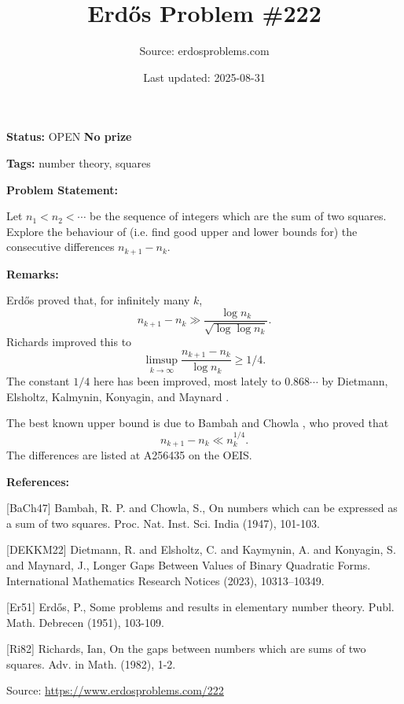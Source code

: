 \documentclass{article}
\title{Erd\H{o}s Problem \#222}
\date{Last updated: 2025-08-31}
\author{Source: erdosproblems.com}
\begin{document}
\maketitle

\noindent\textbf{Status:} OPEN \quad \textbf{No prize}

\noindent\textbf{Tags:} number theory, squares

\medskip
\noindent\textbf{Problem Statement:}

Let $n_1<n_2<\cdots$ be the sequence of integers which are the sum of two squares. Explore the behaviour of (i.e. find good upper and lower bounds for) the consecutive differences $n_{k+1}-n_k$.

\bigskip
\noindent\textbf{Remarks:}

Erd\H{o}s \cite{Er51} proved that, for infinitely many $k$,\[ n_{k+1}-n_k \gg \frac{\log n_k}{\sqrt{\log\log n_k}}.\]Richards \cite{Ri82} improved this to\[\limsup_{k\to \infty} \frac{n_{k+1}-n_k}{\log n_k} \geq 1/4.\]The constant $1/4$ here has been improved, most lately to $0.868\cdots$ by Dietmann, Elsholtz, Kalmynin, Konyagin, and Maynard \cite{DEKKM22}. 

The best known upper bound is due to Bambah and Chowla \cite{BaCh47}, who proved that\[n_{k+1}-n_k \ll n_k^{1/4}.\]The differences are listed at A256435 on the OEIS.

\bigskip
\noindent\textbf{References:}

[BaCh47] Bambah, R. P. and Chowla, S., On numbers which can be expressed as a sum of two squares. Proc. Nat. Inst. Sci. India (1947), 101-103.
 
 [DEKKM22] Dietmann, R. and Elsholtz, C. and Kaymynin, A. and Konyagin, S. and Maynard, J., Longer Gaps Between Values of Binary Quadratic Forms. International Mathematics Research Notices (2023), 10313–10349.
 
 [Er51] Erd\H{o}s, P., Some problems and results in elementary number theory. Publ. Math. Debrecen (1951), 103-109.
 
 [Ri82] Richards, Ian, On the gaps between numbers which are sums of two squares. Adv. in Math. (1982), 1-2.

\bigskip
\noindent\small{Source: \url{https://www.erdosproblems.com/222}}
\end{document}
